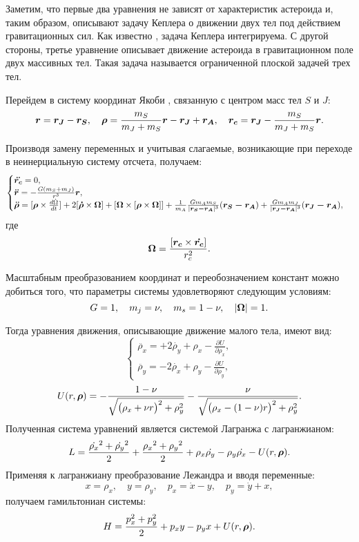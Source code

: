 Заметим, что первые два уравнения не зависят от характеристик астероида и, таким образом, описывают задачу Кеплера о движении двух тел под действием гравитационных сил. Как известно \cite{dub}, задача Кеплера интегрируема. С другой стороны, третье уравнение описывает движение астероида в гравитационном поле двух массивных тел. Такая задача называется ограниченной плоской задачей трех тел.

Перейдем в систему координат Якоби \cite{dub}, связанную с центром масс тел $S$ и $J$:
$$
\boldsymbol{r} = \boldsymbol{r_J}-\boldsymbol{r_S},\quad
\boldsymbol{\rho} = \frac{m_S}{m_J+m_S} \boldsymbol{r} - \boldsymbol{r_J} + \boldsymbol{r_A},\quad
\boldsymbol{r_c} = \boldsymbol{r_J} - \frac{m_S}{m_J+m_S} \boldsymbol{r}.
$$

Производя замену переменных и учитывая слагаемые, возникающие при переходе в неинерциальную систему отсчета, получаем:
\begin{equation*}
\begin{cases}
\boldsymbol{\ddot{r_c}} = 0, \\
\boldsymbol{\ddot{r}} = -\frac{G(m_S+m_J)}{r^3} \boldsymbol{r},  \\
\boldsymbol{\ddot{\rho}} = [\boldsymbol{\rho} \times \frac{d \dot{\Omega}}{dt}]  + 2[\boldsymbol{\dot{\rho}} \times \boldsymbol{\Omega}] + [\boldsymbol{\Omega} \times [\boldsymbol{\rho} \times \boldsymbol{\Omega}]] + \frac{1}{m_A} \frac{G m_A m_S}{|\boldsymbol{r_S-r_A}|^3} (\boldsymbol{r_S-r_A})+
   \frac{G m_A m_J}{|\boldsymbol{r_J-r_A}|^3} (\boldsymbol{r_J-r_A}),  
 \end{cases}
\end{equation*}
где
$$
\boldsymbol{\Omega} = \frac{[\boldsymbol{r_c} \times \boldsymbol{\dot{r_c}}]}{r_c^2}.
$$

Масштабным преобразованием координат и переобозначением констант можно  добиться того, что параметры системы удовлетворяют следующим условиям:
$$
G = 1,\quad 
m_j = \nu,\quad 
m_s = 1 - \nu,\quad
|\boldsymbol{\Omega}| = 1.
$$

Тогда уравнения движения, описывающие движение малого тела, имеют вид:
\begin{equation*}
 \begin{cases}
   \ddot{\rho_x}=+2 \dot{\rho_y} + \rho_x - \frac{\partial U}{\partial \rho_x}, \\
   \ddot{\rho_y}=-2 \dot{\rho_x} + \rho_y - \frac{\partial U}{\partial \rho_y},
 \end{cases}
\end{equation*}
$$U(r, \boldsymbol{\rho}) = - \frac{1-\nu}{\sqrt{\big(\rho_x + \nu r \big)^2 + \rho_y^2}} - \frac{\nu}{\sqrt{\big(\rho_x - (1-  \nu ) r \big)^2 + \rho_y^2}}.$$
Полученная система уравнений является системой Лагранжа с лагранжианом:
$$L = \frac{\dot{\rho_x}^2 + \dot{\rho_y}^2}{2} + \frac{{\rho_x}^2 + {\rho_y}^2}{2} + \rho_x \dot{\rho_y} - \rho_y \dot{\rho_x} - U(r,\boldsymbol{\rho}) .$$
Применяя к лагранжиану преобразование Лежандра и вводя переменные:
$$
x = \rho_x,\quad
y = \rho_y,\quad
p_x = \dot{x} - y,\quad
p_y = \dot{y} + x,
$$
получаем гамильтониан системы:
$$H = \frac{p_x^2 + p_y^2}{2} + p_xy - p_yx + U(r,\boldsymbol{\rho}).$$

